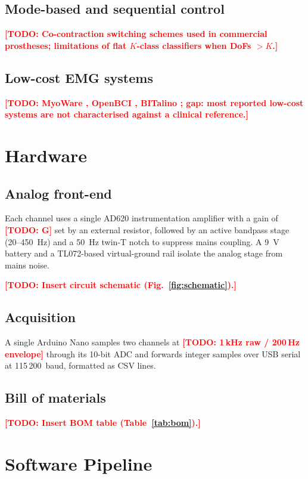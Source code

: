 \documentclass[conference]{IEEEtran}
\newcommand{\todo}[1]{\textcolor{red}{\textbf{[TODO: #1]}}}
\begin{document}
\subsection{Mode-based and sequential control}
\todo{Co-contraction switching schemes used in commercial prostheses;
limitations of flat $K$-class classifiers when DoFs $> K$.}

\subsection{Low-cost EMG systems}
\todo{MyoWare \cite{myoware}, OpenBCI \cite{openbci}, BITalino
\cite{bitalino}; gap: most reported low-cost systems are not characterised
against a clinical reference.}

\section{Hardware}
\label{sec:hardware}

\subsection{Analog front-end}
Each channel uses a single AD620 instrumentation amplifier with a gain of
\todo{G} set by an external resistor, followed by an active bandpass stage
(20--450~Hz) and a 50~Hz twin-T notch to suppress mains coupling. A 9~V
battery and a TL072-based virtual-ground rail isolate the analog stage
from mains noise.

\todo{Insert circuit schematic (Fig.~\ref{fig:schematic}).}

\subsection{Acquisition}
A single Arduino Nano samples two channels at \todo{1\,kHz raw / 200\,Hz
envelope} through its 10-bit ADC and forwards integer samples over USB
serial at 115\,200~baud, formatted as CSV lines.

\subsection{Bill of materials}
\todo{Insert BOM table (Table~\ref{tab:bom}).}

\section{Software Pipeline}
\label{sec:software}
\end{document}
